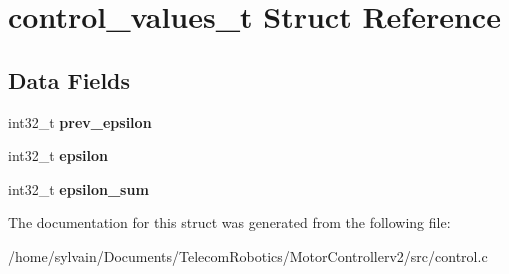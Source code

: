 \hypertarget{structcontrol__values__t}{}\section{control\+\_\+values\+\_\+t Struct Reference}
\label{structcontrol__values__t}
\subsection*{Data Fields}
\begin{DoxyCompactItemize}
\item 
\hypertarget{structcontrol__values__t_ad596b2a193a958f0a5382cb441c3bae0}{}\label{structcontrol__values__t_ad596b2a193a958f0a5382cb441c3bae0} 
int32\+\_\+t {\bfseries prev\+\_\+epsilon}
\item 
\hypertarget{structcontrol__values__t_aced2a804b432cd293c3025b31019db7d}{}\label{structcontrol__values__t_aced2a804b432cd293c3025b31019db7d} 
int32\+\_\+t {\bfseries epsilon}
\item 
\hypertarget{structcontrol__values__t_acdbe73c9f9da537db6c3382202211d00}{}\label{structcontrol__values__t_acdbe73c9f9da537db6c3382202211d00} 
int32\+\_\+t {\bfseries epsilon\+\_\+sum}
\end{DoxyCompactItemize}


The documentation for this struct was generated from the following file\+:\begin{DoxyCompactItemize}
\item 
/home/sylvain/\+Documents/\+Telecom\+Robotics/\+Motor\+Controllerv2/src/control.\+c\end{DoxyCompactItemize}
